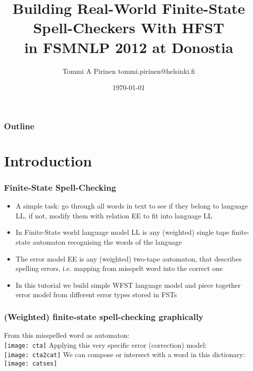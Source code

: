 \documentclass[t,12pt,pdftex]{beamer}
\title{Building Real-World Finite-State Spell-Checkers With HFST\\
\scriptsize{in FSMNLP 2012 at Donostia}}
\author{Tommi A Pirinen \scriptsize \guilsinglleft{}tommi.pirinen@helsinki.fi\guilsinglright{}}
\institute{University of Helsinki\\Department of Modern Languages}
\date{\today}
\begin{document}

\HyTitle

\begin{frame}
    \frametitle{Outline}
    \tableofcontents
\end{frame}



\section{Introduction}

\begin{frame}
    \frametitle{Finite-State Spell-Checking}
    
    \begin{itemize}
        \item A simple task: go through all words in text to see if they
            belong to language LL, if not, modify them with relation
            EE to fit into language LL
        \item In Finite-State world language model LL is any (weighted) single
            tape finite-state automaton recognising the words of the
            language
        \item The error model EE is any (weighted) two-tape automaton, that
            describes spelling errors, i.e. mapping from misspelt word into
            the correct one
        \item In this tutorial we build simple WFST language model and piece
            together error model from different error types stored in FSTs
    \end{itemize}
\end{frame}

\begin{frame}
    \frametitle{(Weighted) finite-state spell-checking graphically}
    From this misspelled word as automaton:\\
\texttt{[image: cta]}
    Applying this very specific error (correction) model:\\
\texttt{[image: cta2cat]}
    We can compose or intersect with a word in this dictionary:\\
\texttt{[image: catses]}
\end{frame}
\end{document}

